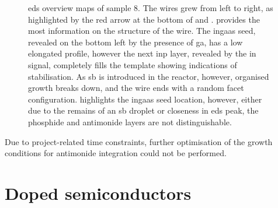 \begin{figure}
{
    }
    \caption[\acs{eds} overview maps of sample 8.]{\acs{eds} overview maps of sample 8. The wires grew from left to right, as highlighted by the red arrow at the bottom of  and .  provides the most information on the structure of the wire. The \acs{ingaas} seed, revealed on the bottom left by the presence of \acs{ga}, has a low elongated profile, however the next \acs{inp} layer, revealed by the \acs{in} signal, completely fills the template showing indications of  stabilisation. As \acs{sb} is introduced in the reactor, however, organised growth breaks down, and the wire ends with a random facet configuration.  highlights the \acs{ingaas} seed location, however, either due to the remains of an \acs{sb} droplet or closeness in \acs{eds} peak, the phosphide and antimonide layers are not distinguishable.}
    \label{fig:s8_EDS_maps}
\end{figure}

Due to project-related time constraints, further optimisation of the growth conditions for antimonide integration could not be performed.

\section{Doped semiconductors}

